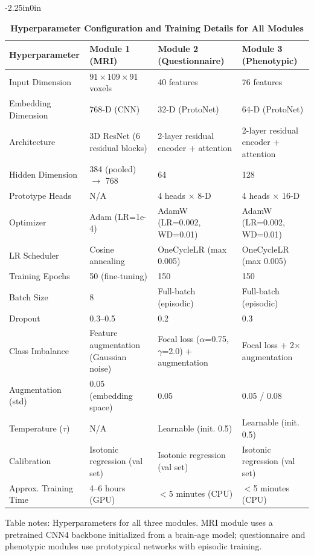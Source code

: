 \documentclass[10pt,letterpaper]{article}
\begin{document}
\begin{table}[!t]
\begin{adjustwidth}{-2.25in}{0in}
\centering
\caption{\textbf{Hyperparameter Configuration and Training Details for All Modules}}
\label{tab:hyperparams}
\footnotesize
\renewcommand{\arraystretch}{1.15}

\begin{tabular}{|p{3.2cm}|p{4.5cm}|p{4.5cm}|p{3.5cm}|}
\hline
\textbf{Hyperparameter} & \textbf{Module 1 (MRI)} & \textbf{Module 2 (Questionnaire)} & \textbf{Module 3 (Phenotypic)} \\
\hline
Input Dimension & $91\times109\times91$ voxels & 40 features & 76 features \\
\hline
Embedding Dimension & 768-D (CNN) & 32-D (ProtoNet) & 64-D (ProtoNet) \\
\hline
Architecture & 3D ResNet (6 residual blocks) & 2-layer residual encoder + attention & 2-layer residual encoder + attention \\
\hline
Hidden Dimension & 384 (pooled) $\to$ 768 & 64 & 128 \\
\hline
Prototype Heads & N/A & 4 heads $\times$ 8-D & 4 heads $\times$ 16-D \\
\hline
Optimizer & Adam (LR=1e-4) & AdamW (LR=0.002, WD=0.01) & AdamW (LR=0.002, WD=0.01) \\
\hline
LR Scheduler & Cosine annealing & OneCycleLR (max 0.005) & OneCycleLR (max 0.005) \\
\hline
Training Epochs & 50 (fine-tuning) & 150 & 150 \\
\hline
Batch Size & 8 & Full-batch (episodic) & Full-batch (episodic) \\
\hline
Dropout & 0.3--0.5 & 0.2 & 0.3 \\
\hline
Class Imbalance & Feature augmentation (Gaussian noise) & Focal loss ($\alpha$=0.75, $\gamma$=2.0) + augmentation & Focal loss + 2$\times$ augmentation \\
\hline
Augmentation (std) & 0.05 (embedding space) & 0.05 & 0.05 / 0.08 \\
\hline
Temperature ($\tau$) & N/A & Learnable (init. 0.5) & Learnable (init. 0.5) \\
\hline
Calibration & Isotonic regression (val set) & Isotonic regression (val set) & Isotonic regression (val set) \\
\hline
Approx. Training Time & 4--6 hours (GPU) & $<$5 minutes (CPU) & $<$5 minutes (CPU) \\
\hline
\end{tabular}

\begin{flushleft}
Table notes: Hyperparameters for all three modules. MRI module uses a pretrained CNN4 backbone initialized from a brain-age model; questionnaire and phenotypic modules use prototypical networks with episodic training.
\end{flushleft}

\end{adjustwidth}
\end{table}
\end{document}
